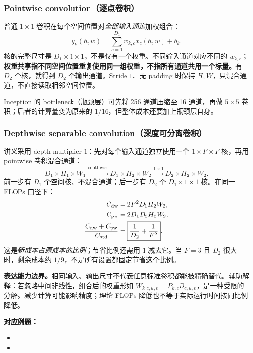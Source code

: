\subsubsection{Pointwise convolution（逐点卷积）}

普通 $1\times1$ 卷积在每个空间位置对\emph{全部输入通道}加权组合：
\[
  y_k(h,w)=\sum_{c=1}^{D_1}w_{k,c}x_c(h,w)+b_k.
\]
核的完整尺寸是 $D_1\times1\times1$，不是仅有一个权重。不同输入通道对应不同的 $w_{k,c}$；\textbf{权重共享指不同空间位置重复使用同一组权重，不指所有通道共用一个标量。}有 $D_2$ 个核，就得到 $D_2$ 个输出通道。Stride $1$、无 padding 时保持 $H,W$，只混合通道，不直接读取相邻空间位置。

Inception 的 bottleneck（瓶颈层）可先将 256 通道压缩至 16 通道，再做 $5\times5$ 卷积；后者的计算量变为原来的 $1/16$，但整体成本还要加上瓶颈层自身。

\subsubsection{Depthwise separable convolution（深度可分离卷积）}

讲义采用 depth multiplier $1$：先对每个输入通道独立使用一个 $1\times F\times F$ 核，再用 pointwise 卷积混合通道：
\[
  D_1\times H_1\times W_1
  \xrightarrow{\text{depthwise}} D_1\times H_2\times W_2
  \xrightarrow{1\times1} D_2\times H_2\times W_2.
\]
前一步有 $D_1$ 个空间核、不混合通道；后一步有 $D_2$ 个 $D_1\times1\times1$ 核。在同一 FLOPs 口径下：
\[
\begin{aligned}
 C_{\rm dw}&=2F^2D_1H_2W_2,\\
 C_{\rm pw}&=2D_1D_2H_2W_2,\\
 \frac{C_{\rm dw}+C_{\rm pw}}{C_{\rm std}}
 &=\boxed{\frac{1}{D_2}+\frac{1}{F^2}}.
\end{aligned}
\]
这是\emph{新成本占原成本的比例}；节省比例还需用 $1$ 减去它。当 $F=3$ 且 $D_2$ 很大时，剩余成本约 $1/9$，不是所有设置都固定节省这个比例。

\textbf{表达能力边界。}相同输入、输出尺寸不代表任意标准卷积都能被精确替代。辅助解释：若忽略中间非线性，组合后的权重形如 $W_{k,c,u,v}=P_{k,c}D_{c,u,v}$，是一种受限的分解。减少计算可能影响精度；理论 FLOPs 降低也不等于实际运行时间按同比例降低。

\textbf{对应例题：}
\begin{itemize}
 \item {}
 \item {}
\end{itemize}

